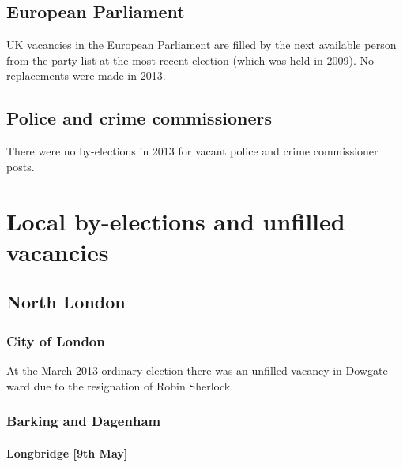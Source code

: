 \documentclass[a4paper,openany,10pt]{book}
\begin{document}
\section{European Parliament}

UK vacancies in the European Parliament are filled by the next available person from the party list at the most recent election (which was held in 2009). 
No replacements were made in 2013.


\section{Police and crime commissioners}

There were no by-elections in 2013 for vacant police and crime commissioner posts.

\chapter{Local by-elections and unfilled vacancies}



\section{North London}

\subsection*{City of London}

At the March 2013 ordinary election there was an unfilled vacancy in Dowgate ward due to the resignation of Robin Sherlock.


\subsection*{Barking and Dagenham}

\subsubsection*{Longbridge \hspace*{\fill}\nolinebreak[1]%
\enspace\hspace*{\fill}
[9th May]}
\end{document}
